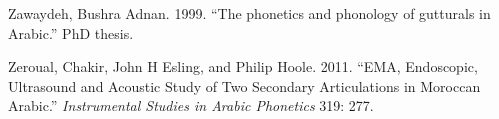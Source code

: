 \documentclass[
]{interact}
\newlength{\cslhangindent}
\newenvironment{CSLReferences}[2] %
 {\begin{list}{}{%
  \setlength{\itemindent}{0pt}
  \setlength{\leftmargin}{0pt}
  \setlength{\parsep}{0pt}
  \ifodd #1
   \setlength{\leftmargin}{\cslhangindent}
   \setlength{\itemindent}{-1\cslhangindent}
  \fi
  \setlength{\itemsep}{#2\baselineskip}}}
 {\end{list}}
\begin{document}
\begin{CSLReferences}{1}{0}
Zawaydeh, Bushra Adnan. 1999. {``The phonetics and phonology of
gutturals in Arabic.''} PhD thesis.

Zeroual, Chakir, John H Esling, and Philip Hoole. 2011. {``EMA,
Endoscopic, Ultrasound and Acoustic Study of Two Secondary Articulations
in Moroccan Arabic.''} \emph{Instrumental Studies in Arabic Phonetics}
319: 277.

\end{CSLReferences}
\end{document}
